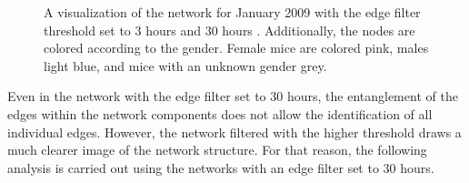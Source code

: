 \begin{figure}[htpb]%
	\centering 
	\qquad 
			
	\caption[Network visualizations with different edge filter values]{A visualization of the network for January 2009 with the edge filter threshold set to 3 hours  and 30 hours . Additionally, the nodes are colored according to the gender. Female mice are colored pink, males light blue, and mice with an unknown gender grey.}  
\end{figure}


Even in the network with the edge filter set to 30 hours, the entanglement of the edges within the network components does not allow the identification of all individual edges. However, the network filtered with the higher threshold draws a much clearer image of the network structure. For that reason, the following analysis is carried out using the networks with an edge filter set to 30 hours.



